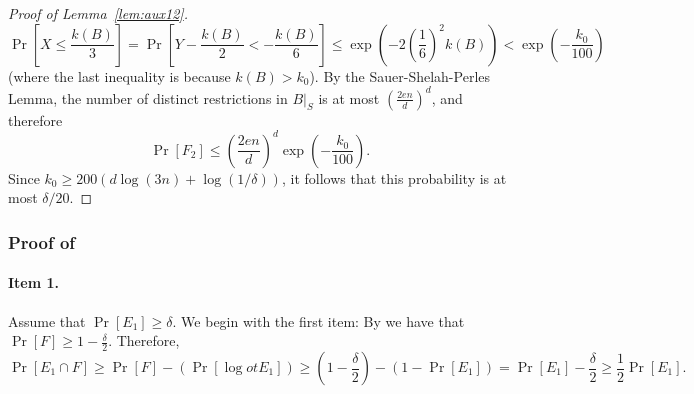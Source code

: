 \documentclass{article}
\newcommand{\comment}[3]{{\color{#1} {\bf #2 :} #3}}
\newcommand{\shay}[1]{\comment{purple}{Shay}{#1}}
\newcommand{\akshay}[1]{\comment{blue}{Akshay}{#1}}
\newcommand{\yoav}[1]{\comment{green}{Yoav}{#1}}
\begin{document}
\begin{proof}[Proof of Lemma~\ref{lem:aux12}]
\[
\Pr\left[X\leq \frac{k(B)}{3}\right] =\Pr\left[Y- \frac{k(B)}{2} < -\frac{k(B)}{6}\right]
						\leq \exp\left(-2\left(\frac{1}{6}\right)^2k(B)\right) 
						< \exp\left(-\frac{k_0}{100}\right)
\]
(where the last inequality is because $k(B) > k_0$).
By the Sauer-Shelah-Perles Lemma,
the number of distinct restrictions in $B|_S$ is at most $\left(\frac{2en}{d}\right)^d$, and therefore 
\[\Pr[F_2]\leq \left(\frac{2en}{d}\right)^d\exp\left(-\frac{k_0}{100}\right).\]
Since $k_0\geq 200\left(d\log(3n) + \log(1/\delta) \right)$, it follows
that this probability is at most $\delta/20$.
\end{proof}


\subsubsection{Proof of }

\paragraph{Item 1.}
Assume that $\Pr[E_1]\geq \delta$.
We begin with the first item:
By  we have that $\Pr[F]\geq 1-\frac{\delta}{2}$.
Therefore,
\[\Pr[E_1\cap F] \geq \Pr[F] - (\Pr[\log ot E_1]) \geq (1-\frac{\delta}{2}) - (1-\Pr[E_1]) = \Pr[E_1] - \frac{\delta}{2}\geq\frac{1}{2}\Pr[E_1].\]
\end{document}
